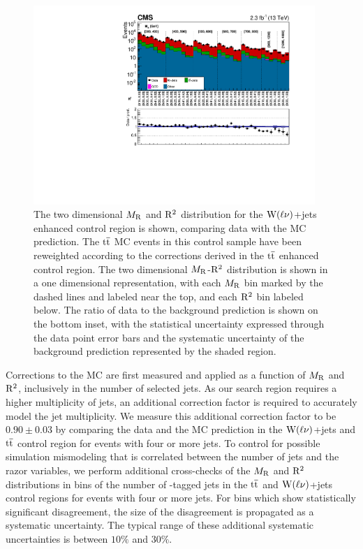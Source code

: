 \begin{figure}[!htb] \centering
\includegraphics[width=0.95\textwidth]{figs/analysis13TeV/TTBarWJets/MRRsqWJetsSingleLeptonUnrolledDataMC.pdf}
\caption{ The two dimensional $M_\mathrm{R}$ and $\mathrm{R}^2$ distribution for the $\mathrm{W}(\ell\nu)$+jets enhanced control region 
is shown, comparing data with the MC prediction. The $\mathrm{t}\overline{\mathrm{t}}$ MC events in this control sample have been reweighted 
according to the corrections derived in the $\mathrm{t}\overline{\mathrm{t}}$ enhanced control region. The two dimensional $M_\mathrm{R}$-$\mathrm{R}^2$ 
distribution is shown in a one dimensional representation, with each $M_\mathrm{R}$ bin marked by the dashed lines and labeled near the top,
and each $\mathrm{R}^2$ bin labeled below. The ratio of data to the background prediction is shown on the bottom inset, with
the statistical uncertainty expressed through the data point error bars and the systematic uncertainty of the
background prediction represented by the shaded region. 
}
\label{fig:WJetsControlRegion_MRRsq_Unrolled}
\end{figure}

Corrections to the MC are first measured and applied as a function of $M_\mathrm{R}$ and $\mathrm{R}^2$, inclusively in the
number of selected jets. As our search region requires a higher multiplicity of jets, an additional correction factor
is required to accurately model the jet multiplicity. We measure this additional 
correction factor to be $0.90 \pm 0.03$ by comparing the data and the MC prediction in the $\mathrm{W}(\ell\nu)$+jets and $\mathrm{t}\overline{\mathrm{t}}$ 
control region for events with four or more jets.
To control for possible simulation mismodeling that is correlated between the number of jets and the razor
variables, we perform additional cross-checks of the $M_\mathrm{R}$ and $\mathrm{R}^2$ distributions in bins of 
the number of \PQb-tagged jets in the $\mathrm{t}\overline{\mathrm{t}}$ and $\mathrm{W}(\ell\nu)$+jets
control regions for events with four or more jets. For bins which show statistically significant disagreement,
the size of the disagreement is propagated as a systematic uncertainty. The typical range of these additional 
systematic uncertainties is between $10\%$ and $30\%$.


